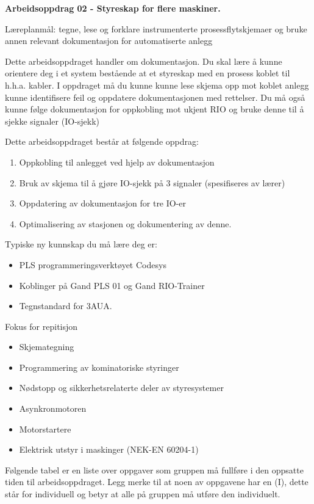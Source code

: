 
\noindent
{\bf Arbeidsoppdrag 02 - Styreskap for flere maskiner.}

\vskip 5pt
Læreplanmål:
tegne, lese og forklare instrumenterte prosessflytskjemaer og bruke annen relevant dokumentasjon for automatiserte anlegg

Dette arbeidsoppdraget handler om dokumentasjon. Du skal lære å kunne orientere deg i et system bestående at et styreskap med en prosess koblet til h.h.a. kabler. I oppdraget må du kunne kunne lese skjema opp mot koblet anlegg kunne identifisere feil og oppdatere dokumentasjonen med rettelser. Du må også kunne følge dokumentasjon for oppkobling mot ukjent RIO og bruke denne til å sjekke signaler (IO-sjekk)

Dette arbeidsoppdraget består at følgende oppdrag:
\begin{enumerate}
	\item Oppkobling til anlegget ved hjelp av dokumentasjon
	\item Bruk av skjema til å gjøre IO-sjekk på 3 signaler (spesifiseres av lærer)
	\item Oppdatering av dokumentasjon for tre IO-er
	\item Optimalisering av stasjonen og dokumentering av denne. 
\end{enumerate}




\vskip 5pt

Typiske ny kunnskap du må lære deg er:
\begin{itemize}[noitemsep]
	\item PLS programmeringsverktøyet Codesys
	\item Koblinger på Gand PLS 01 og Gand RIO-Trainer
	\item Tegnstandard for 3AUA. 
\end{itemize}

Fokus for repitisjon
\begin{itemize}[noitemsep]
	\item Skjemategning
	\item Programmering av kominatoriske styringer
	\item Nødstopp og sikkerhetsrelaterte deler av styresystemer
	\item Asynkronmotoren
	\item Motorstartere
	\item Elektrisk utstyr i maskinger (NEK-EN 60204-1)
\end{itemize}

\vskip 5pt
Følgende tabel er en liste over oppgaver som gruppen må fullføre i den oppsatte tiden til arbeidsoppdraget. Legg merke til at noen av oppgavene har en (I), dette står for individuell og betyr at alle på gruppen må utføre den individuelt.

